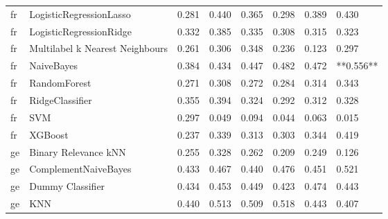 \begin{tabular}{llllllll}
      fr &         LogisticRegressionLasso & 0.281 &                     0.440 &                 0.365 &                  0.298 &                                   0.389 &     0.430 \\
      fr &         LogisticRegressionRidge & 0.332 &                     0.385 &                 0.335 &                  0.308 &                                   0.315 &     0.323 \\
      fr & Multilabel k Nearest Neighbours & 0.261 &                     0.306 &                 0.348 &                  0.236 &                                   0.123 &     0.297 \\
      fr &                      NaiveBayes & 0.384 &                     0.434 &                 0.447 &                  0.482 &                                   0.472 & **0.556** \\
      fr &                    RandomForest & 0.271 &                     0.308 &                 0.272 &                  0.284 &                                   0.314 &     0.343 \\
      fr &                 RidgeClassifier & 0.355 &                     0.394 &                 0.324 &                  0.292 &                                   0.312 &     0.328 \\
      fr &                             SVM & 0.297 &                     0.049 &                 0.094 &                  0.044 &                                   0.063 &     0.015 \\
      fr &                         XGBoost & 0.237 &                     0.339 &                 0.313 &                  0.303 &                                   0.344 &     0.419 \\
      ge &            Binary Relevance kNN & 0.255 &                     0.328 &                 0.262 &                  0.209 &                                   0.249 &     0.126 \\
      ge &            ComplementNaiveBayes & 0.433 &                     0.467 &                 0.440 &                  0.476 &                                   0.451 &     0.521 \\
      ge &                Dummy Classifier & 0.434 &                     0.453 &                 0.449 &                  0.423 &                                   0.474 &     0.443 \\
      ge &                             KNN & 0.440 &                     0.513 &                 0.509 &                  0.518 &                                   0.443 &     0.407 \\

\end{tabular}

